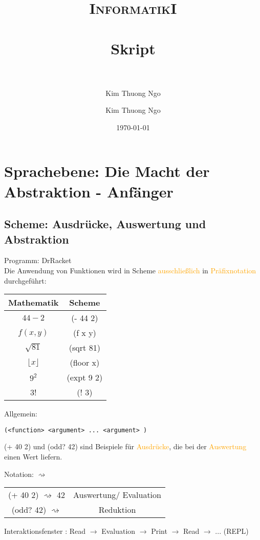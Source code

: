 \documentclass[paper=a4, fontsize=11pt]{scrartcl}
\author{Kim Thuong Ngo}
\title{	
\normalfont \normalsize 
\textsc{InformatikI} \\ [25pt] 
\horrule{0.5pt} \\[0.4cm] 
\huge Skript \\ 
\horrule{2pt} \\[0.5cm] 
}
\author{Kim Thuong Ngo}
\date{\normalsize\today}
\numberwithin{equation}{section}
\numberwithin{figure}{section}
\numberwithin{table}{section}
\begin{document}
\maketitle 
\newpage
\tableofcontents
\newpage
\section{Sprachebene: Die Macht der Abstraktion - Anfänger}
\subsection{Scheme: Ausdrücke, Auswertung und Abstraktion}
Programm: DrRacket \\

Die Anwendung von Funktionen wird in Scheme \textcolor{orange}{ausschließlich} in \textcolor{orange}{Präfixnotation} durchgeführt: \\

\begin{tabular}{c|c}
Mathematik & Scheme \\\hline
$44-2$ & (- 44 2) \\
$f(x,y)$ & (f x y)\\
$\sqrt{81}$ & (sqrt 81)\\
$\lfloor x \rfloor$ & (floor x)\\
$9^{2}$  & (expt 9 2) \\
3! & (! 3) \\
\end{tabular}

Allgemein:
\begin{lstlisting}
(<function> <argument> ... <argument> )
\end{lstlisting}

(+ 40 2) und (odd? 42) sind Beispiele für \textcolor{orange}{Ausdrücke}, die bei der \textcolor{orange}{Auswertung} einen Wert liefern.

Notation: $\rightsquigarrow$ \\
\begin{tabular}{cc}
(+ 40 2) $\rightsquigarrow$ 42 & Auswertung/ Evaluation \\
(odd? 42) $\rightsquigarrow$ & Reduktion \\
\end{tabular}

Interaktionsfenster : Read $\rightarrow$ Evaluation $\rightarrow$ Print $\rightarrow$ Read $\rightarrow$ ... (REPL) \\
\end{document}
